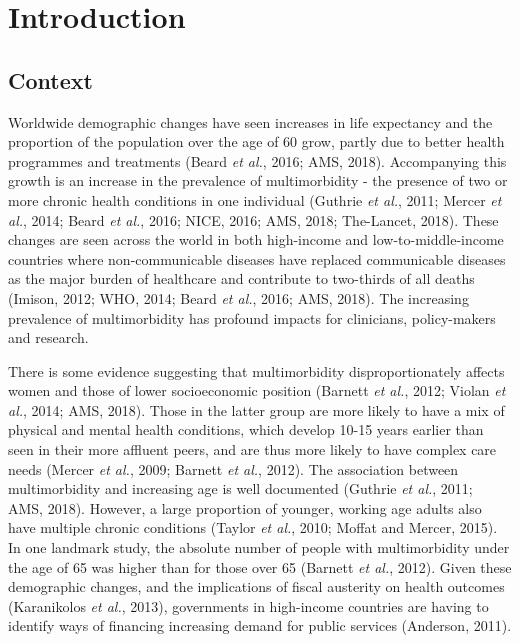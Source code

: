 \documentclass[12pt,a4paper,oneside,table]{report}
\begin{document}
\setlength{\parskip}{1em}

\newpage
\fancyhf{}
\fancyhead[CE,CO]{\footnotesize \leftmark}
\fancyfoot[LE,LO]{\scriptsize \rightmark}
\renewcommand{\headrulewidth}{0pt}

\chapter{Introduction}\label{ch:intro}
\thispagestyle{empty}

\section{Context}\label{sec:intro-context}

Worldwide demographic changes have seen increases in life expectancy and
the proportion of the population over the age of 60 grow, partly due to
better health programmes and treatments (Beard \emph{et al.}, 2016; AMS,
2018). Accompanying this growth is an increase in the prevalence of
multimorbidity - the presence of two or more chronic health conditions
in one individual (Guthrie \emph{et al.}, 2011; Mercer \emph{et al.},
2014; Beard \emph{et al.}, 2016; NICE, 2016; AMS, 2018; The-Lancet,
2018). These changes are seen across the world in both high-income and
low-to-middle-income countries where non-communicable diseases have
replaced communicable diseases as the major burden of healthcare and
contribute to two-thirds of all deaths (Imison, 2012; WHO, 2014; Beard
\emph{et al.}, 2016; AMS, 2018). The increasing prevalence of
multimorbidity has profound impacts for clinicians, policy-makers and
research.

There is some evidence suggesting that multimorbidity disproportionately
affects women and those of lower socioeconomic position (Barnett
\emph{et al.}, 2012; Violan \emph{et al.}, 2014; AMS, 2018). Those in
the latter group are more likely to have a mix of physical and mental
health conditions, which develop 10-15 years earlier than seen in their
more affluent peers, and are thus more likely to have complex care needs
(Mercer \emph{et al.}, 2009; Barnett \emph{et al.}, 2012). The
association between multimorbidity and increasing age is well documented
(Guthrie \emph{et al.}, 2011; AMS, 2018). However, a large proportion of
younger, working age adults also have multiple chronic conditions
(Taylor \emph{et al.}, 2010; Moffat and Mercer, 2015). In one landmark
study, the absolute number of people with multimorbidity under the age
of 65 was higher than for those over 65 (Barnett \emph{et al.}, 2012).
Given these demographic changes, and the implications of fiscal
austerity on health outcomes (Karanikolos \emph{et al.}, 2013),
governments in high-income countries are having to identify ways of
financing increasing demand for public services (Anderson, 2011).
\end{document}
